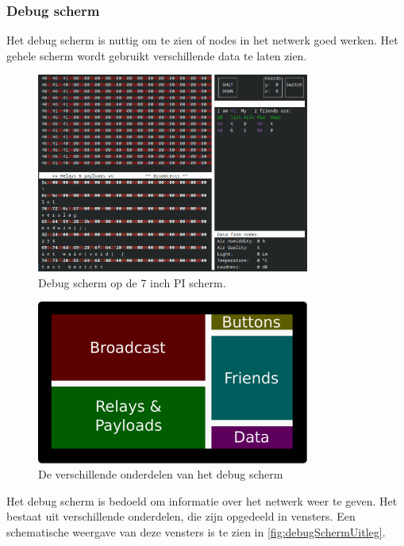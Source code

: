 \subsubsection*{Debug scherm}
Het debug scherm is nuttig om te zien of nodes in het netwerk goed werken. 
Het gehele scherm wordt gebruikt verschillende data te laten zien. 
\begin{figure}[ht]
    \centering
    \includegraphics*[width=0.8\textwidth]{img/basestationInterface.png}
    \caption{Debug scherm op de 7 inch PI scherm.}
    \label{fig:debugSchermScreenshot}
\end{figure}

\begin{figure}[ht]
    \centering
    \includegraphics*[width=0.8\textwidth]{img/debugScreenExplain.pdf}
    \caption{De verschillende onderdelen van het debug scherm}
    \label{fig:debugSchermUitleg}
\end{figure}
Het debug scherm is bedoeld om informatie over het netwerk weer te geven. Het bestaat uit verschillende onderdelen, die zijn opgedeeld in vensters. Een schematische weergave van deze vensters is te zien in \autoref{fig:debugSchermUitleg}.

